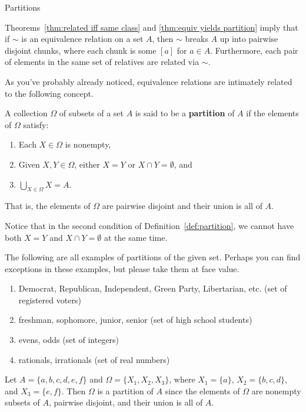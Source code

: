 \begin{section}{Partitions}

Theorems~\ref{thm:related iff same class} and \ref{thm:equiv yields partition} imply that if $\sim$ is an equivalence relation on a set $A$, then $\sim$ breaks $A$ up into pairwise disjoint chunks, where each chunk is some $[a]$ for $a\in A$. Furthermore, each  pair of elements in the same set of relatives are related via $\sim$.

As you've probably already noticed, equivalence relations are intimately related to the following concept.

\begin{definition}\label{def:partition}
A collection $\Omega$ of subsets of a set $A$ is said to be a \textbf{partition} of $A$ if the elements of $\Omega$ satisfy:
\begin{enumerate}[label=\textrm{(\alph*)}]
\item Each $X\in \Omega$ is nonempty,
\item Given $X,Y\in\Omega$, either $X=Y$ or $X\cap Y=\emptyset$, and
\item $\displaystyle \bigcup_{X\in\Omega}X=A$.
\end{enumerate}
That is, the elements of $\Omega$ are pairwise disjoint and their union is all of $A$.
\end{definition}

Notice that in the second condition of Definition~\ref{def:partition}, we cannot have both $X=Y$ and $X\cap Y=\emptyset$ at the same time.

\begin{example}
The following are all examples of partitions of the given set.  Perhaps you can find exceptions in these examples, but please take them at face value.
\begin{enumerate}[label=\textrm{(\alph*)}]
\item Democrat, Republican, Independent, Green Party, Libertarian, etc. (set of registered voters)
\item freshman, sophomore, junior, senior (set of high school students)
\item evens, odds (set of integers)
\item rationals, irrationals (set of real numbers)
\end{enumerate}
\end{example}

\begin{example}\label{ex:a partition}
Let $A=\{a,b,c,d,e,f\}$ and $\Omega=\{X_{1},X_{2},X_{3}\}$, where $X_{1}=\{a\}$, $X_{2}=\{b,c,d\}$, and $X_{3}=\{e,f\}$.  Then $\Omega$ is a partition of $A$ since the elements of $\Omega$ are nonempty subsets of $A$, pairwise disjoint, and their union is all of $A$.
\end{example}


\end{section}
